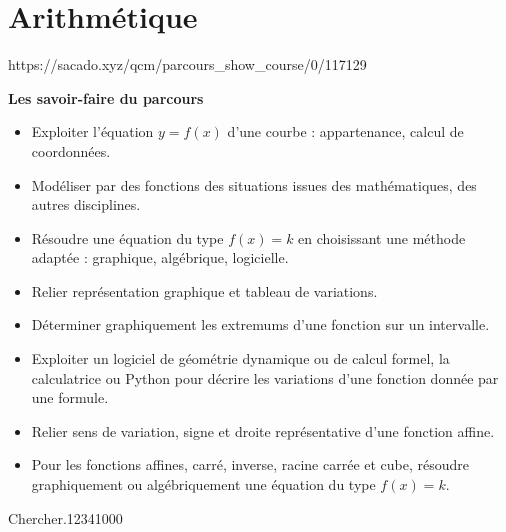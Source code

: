 \chapter{Arithmétique}
{https://sacado.xyz/qcm/parcours_show_course/0/117129}
{


 \begin{CpsCol}
\textbf{Les savoir-faire du parcours}
 \begin{itemize}
 \item Exploiter l'équation $y = f(x)$ d'une courbe : appartenance, calcul de coordonnées.
 \item  Modéliser par des fonctions des situations issues des mathématiques, des autres disciplines.
 \item Résoudre une équation du type $f(x) = k$ en choisissant une méthode adaptée :
graphique, algébrique, logicielle.
 \item Relier représentation graphique et tableau de variations.
 \item Déterminer graphiquement les extremums d'une fonction sur un intervalle.
 \item Exploiter un logiciel de géométrie dynamique ou de calcul formel, la calculatrice ou Python pour décrire
les variations d'une fonction donnée par une formule.
 \item Relier sens de variation, signe et droite représentative d'une fonction affine.
 \item Pour les fonctions affines, carré, inverse, racine carrée et cube, résoudre graphiquement ou algébriquement
une équation du type $f(x) = k$.
 \end{itemize}
 \end{CpsCol}

\begin{His}

 

\end{His}

 

\begin{ExoDec}{Chercher.}{1234}{1}{0}{0}{0}

 
 
\end{ExoDec}

}


